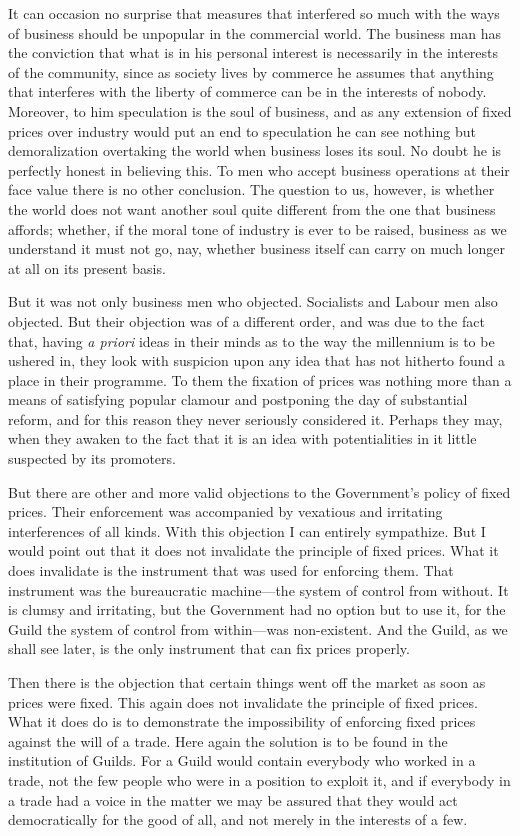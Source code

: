 \documentclass{book}
\begin{document}
It can occasion no surprise that measures that interfered so much with the ways of business should be unpopular in the commercial world. The business man has the conviction that what is in his personal interest is necessarily in the interests of the community, since as society lives by commerce he assumes that anything that interferes with the liberty of commerce can be in the interests of nobody. Moreover, to him speculation is the soul of business, and as any extension of fixed prices over industry would put an end to speculation he can see nothing but demoralization overtaking the world when business loses its soul. No doubt he is perfectly honest in believing this. To men who accept business operations at their face value there is no other conclusion. The question to us, however, is whether the world does not want another soul quite different from the one that business affords; whether, if the moral tone of industry is ever to be raised, business as we understand it must not go, nay, whether business itself can carry on much longer at all on its present basis.

But it was not only business men who objected. Socialists and Labour men also objected. But their objection was of a different order, and was due to the fact that, having \emph{a priori} ideas in their minds as to the way the millennium is to be ushered in, they look with suspicion upon any idea that has not hitherto found a place in their programme. To them the fixation of prices was nothing more than a means of satisfying popular clamour and postponing the day of substantial reform, and for this reason they never seriously considered it. Perhaps they may, when they awaken to the fact that it is an idea with potentialities in it little suspected by its promoters.

But there are other and more valid objections to the Government’s policy of fixed prices. Their enforcement was accompanied by vexatious and irritating interferences of all kinds. With this objection I can entirely sympathize. But I would point out that it does not invalidate the principle of fixed prices. What it does invalidate is the instrument that was used for enforcing them. That instrument was the bureaucratic machine—the system of control from without. It is clumsy and irritating, but the Government had no option but to use it, for the Guild the system of control from within—was non-existent. And the Guild, as we shall see later, is the only instrument that can fix prices properly.

Then there is the objection that certain things went off the market as soon as prices were fixed. This again does not invalidate the principle of fixed prices. What it does do is to demonstrate the impossibility of enforcing fixed prices against the will of a trade. Here again the solution is to be found in the institution of Guilds. For a Guild would contain everybody who worked in a trade, not the few people who were in a position to exploit it, and if everybody in a trade had a voice in the matter we may be assured that they would act democratically for the good of all, and not merely in the interests of a few.
\end{document}
